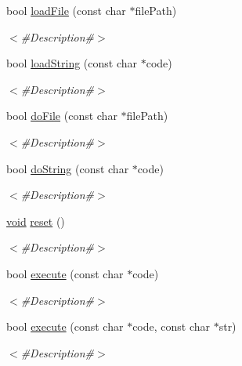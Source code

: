 \begin{DoxyCompactItemize}
bool \mbox{\hyperlink{classnjli_1_1_world_lua_virtual_machine_adc172de3b59b78472ff5867f5e16041c}{load\+File}} (const char $\ast$file\+Path)
\begin{DoxyCompactList}\small\item\em $<$\#\+Description\#$>$ \end{DoxyCompactList}\item 
bool \mbox{\hyperlink{classnjli_1_1_world_lua_virtual_machine_ab7d712b7c1b78da1f32e70791adc1ac2}{load\+String}} (const char $\ast$code)
\begin{DoxyCompactList}\small\item\em $<$\#\+Description\#$>$ \end{DoxyCompactList}\item 
bool \mbox{\hyperlink{classnjli_1_1_world_lua_virtual_machine_a859edc6a83d71fec3722ad76313eef43}{do\+File}} (const char $\ast$file\+Path)
\begin{DoxyCompactList}\small\item\em $<$\#\+Description\#$>$ \end{DoxyCompactList}\item 
bool \mbox{\hyperlink{classnjli_1_1_world_lua_virtual_machine_a56e072d74d6c9810533e395ae44ec49c}{do\+String}} (const char $\ast$code)
\begin{DoxyCompactList}\small\item\em $<$\#\+Description\#$>$ \end{DoxyCompactList}\item 
\mbox{\hyperlink{_thread_8h_af1e856da2e658414cb2456cb6f7ebc66}{void}} \mbox{\hyperlink{classnjli_1_1_world_lua_virtual_machine_a267ae71c6d3064e2baf0ac9e48e4ec24}{reset}} ()
\begin{DoxyCompactList}\small\item\em $<$\#\+Description\#$>$ \end{DoxyCompactList}\item 
bool \mbox{\hyperlink{classnjli_1_1_world_lua_virtual_machine_a5d04b69a8ca98a5e77ec1a03abd6ece1}{execute}} (const char $\ast$code)
\begin{DoxyCompactList}\small\item\em $<$\#\+Description\#$>$ \end{DoxyCompactList}\item 
bool \mbox{\hyperlink{classnjli_1_1_world_lua_virtual_machine_af9efb7780458024e60c886b5c30cc594}{execute}} (const char $\ast$code, const char $\ast$str)
\begin{DoxyCompactList}\small\item\em $<$\#\+Description\#$>$ \end{DoxyCompactList}\item 

\end{DoxyCompactItemize}
